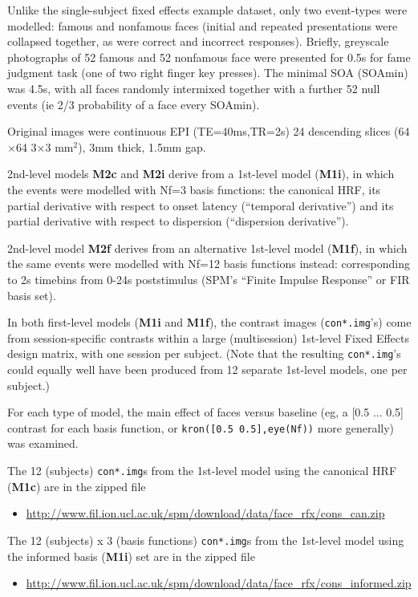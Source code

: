 Unlike the single-subject fixed effects example dataset, only two event-types were modelled: famous and nonfamous faces (initial and repeated presentations were collapsed together, as were correct and incorrect responses). Briefly, greyscale photographs of 52 famous and 52 nonfamous face were presented for 0.5s for fame judgment task (one of two right finger key presses). The minimal SOA (SOAmin) was 4.5s, with all faces randomly intermixed together with a further 52 null events (ie 2/3 probability of a face every SOAmin).

Original images were continuous EPI (TE=40ms,TR=2s) 24 descending slices (64$\times$64 3$\times$3 mm$^2$), 3mm thick, 1.5mm gap.

2nd-level models \textbf{M2c} and \textbf{M2i} derive from a 1st-level model (\textbf{M1i}), in which the events were modelled with Nf=3 basis functions: the canonical HRF, its partial derivative with respect to onset latency (``temporal derivative'') and its partial derivative with respect to dispersion (``dispersion derivative'').

2nd-level model \textbf{M2f} derives from an alternative 1st-level model (\textbf{M1f}), in which the same events were modelled with Nf=12 basis functions instead: corresponding to 2s timebins from 0-24s poststimulus (SPM's ``Finite Impulse Response'' or FIR basis set).

In both first-level models (\textbf{M1i} and \textbf{M1f}), the contrast images (\texttt{con*.img}'s) come from session-specific contrasts within a large (multisession) 1st-level Fixed Effects design matrix, with one session per subject. (Note that the resulting \texttt{con*.img}'s could equally well have been produced from 12 separate 1st-level models, one per subject.)

For each type of model, the main effect of faces versus baseline (eg, a [0.5 ... 0.5] contrast for each basis function, or \texttt{kron([0.5 0.5],eye(Nf))} more generally) was examined.

The 12 (subjects) \texttt{con*.img}s from the 1st-level model using the canonical HRF (\textbf{M1c}) are in the zipped file
\begin{itemize}
\item \url{http://www.fil.ion.ucl.ac.uk/spm/download/data/face_rfx/cons_can.zip}
\end{itemize}

The 12 (subjects) x 3 (basis functions) \texttt{con*.img}s from the 1st-level model using the informed basis (\textbf{M1i}) set are in the zipped file
\begin{itemize}
\item \url{http://www.fil.ion.ucl.ac.uk/spm/download/data/face_rfx/cons_informed.zip}
\end{itemize}

